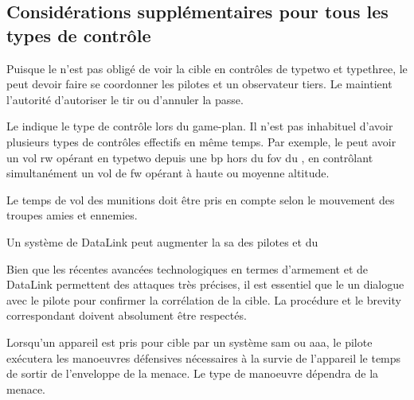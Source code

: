 \subsection{Considérations supplémentaires pour tous les types de contrôle}

\begin{e1}
	\item Puisque le \ja{} n'est pas obligé de voir la cible en contrôles de \gls{typetwo} et \gls{typethree}, le \ja{} peut devoir faire se coordonner les pilotes et un observateur tiers. Le \ja{} maintient l'autorité d'autoriser le tir ou d'annuler la passe.
	\item Le \ja{} indique le type de contrôle lors du game-plan. Il n'est pas inhabituel d'avoir plusieurs types de contrôles effectifs en même temps. Par exemple, le \ja{} peut avoir un vol \gls{rw} opérant en \gls{typetwo} depuis une \gls{bp} hors du \gls{fov} du \ja{}, en contrôlant simultanément un vol de \gls{fw} opérant à haute ou moyenne altitude.
	\item Le temps de vol des munitions doit être pris en compte selon le mouvement des troupes amies et ennemies.
	\item Un système de DataLink peut augmenter la \gls{sa} des pilotes et du \ja{}
	\item Bien que les récentes avancées technologiques en termes d'armement et de DataLink permettent des attaques très précises, il est essentiel que le \ja{} un dialogue avec le pilote pour confirmer la corrélation de la cible. La procédure et le brevity correspondant doivent absolument être respectés.
	\item Lorsqu'un appareil est pris pour cible par un système \gls{sam} ou \gls{aaa}, le pilote exécutera les manoeuvres défensives nécessaires à la survie de l'appareil le temps de sortir de l'enveloppe de la menace. Le type de manoeuvre dépendra de la menace.
	\begin{e2}

\end{e2}
\end{e1}
